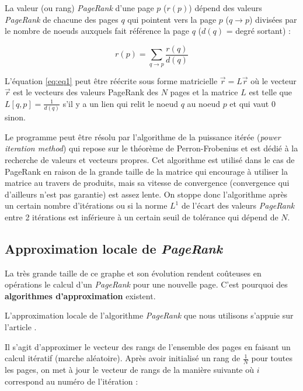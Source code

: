 \documentclass[10pt,a4paper]{article}
\theoremstyle{break}
\begin{document}
La valeur (ou rang) \emph{PageRank} d'une page \(p\) (\(r(p)\)) dépend des valeurs \emph{PageRank} de chacune des pages \(q\) qui pointent vers la page \(p\) (\(q \rightarrow p\)) divisées par le nombre de noeuds auxquels fait référence la page \(q\) (\(d(q)\) = degré sortant) :

\begin{equation} \label{eq:eq1}
r(p)=\sum_{ q \rightarrow p}\frac{r(q)}{d(q)}
\end{equation}

L'équation \ref{eq:eq1} peut être réécrite sous forme matricielle \(\vec{r} = L \vec{r}\) où le vecteur \(\vec{r}\) est le vecteurs des valeurs PageRank des \(N\) pages et la matrice \(L\) est telle que \(L[q, p] = \frac{1}{d(q)}\) s'il y a un lien qui relit le noeud \(q\) au noeud \(p\) et qui vaut 0 sinon.

Le programme peut être résolu par l'algorithme de la puissance itérée (\emph{power iteration method}) qui repose sur le théorème de Perron-Frobenius et est dédié à la recherche de valeurs et vecteurs propres. Cet algorithme est utilisé dans le cas de PageRank en raison de la grande taille de la matrice qui encourage à utiliser la matrice au travers de produits, mais sa vitesse de convergence (convergence qui d'ailleurs n'est pas garantie) est assez lente. On stoppe donc l'algorithme après un certain nombre d'itérations ou si la norme \(L^1\) de l'écart des valeurs \emph{PageRank} entre 2 itérations est inférieure à un certain seuil de tolérance qui dépend de \(N\).

\hypertarget{approximation-locale-de-pagerank}{%
\subsection{\texorpdfstring{Approximation locale de \emph{PageRank}}{Approximation locale de PageRank}}\label{approximation-locale-de-pagerank}}

La très grande taille de ce graphe et son évolution rendent coûteuses en opérations le calcul d'un \emph{PageRank} pour une nouvelle page. C'est pourquoi des \textbf{algorithmes d'approximation} existent.

L'approximation locale de l'algorithme \emph{PageRank} que nous utilisons s'appuie sur l'article \cite{Chen}.

Il s'agit d'approximer le vecteur des rangs de l'ensemble des pages en faisant un calcul itératif (marche aléatoire). Après avoir initialisé un rang de \(\frac{1}{N}\) pour toutes les pages, on met à jour le vecteur de rangs de la manière suivante où \(i\) correspond au numéro de l'itération :
\end{document}
